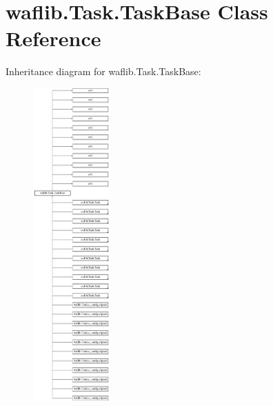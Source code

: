 \hypertarget{classwaflib_1_1_task_1_1_task_base}{}\section{waflib.\+Task.\+Task\+Base Class Reference}
\label{classwaflib_1_1_task_1_1_task_base}
Inheritance diagram for waflib.\+Task.\+Task\+Base\+:\begin{figure}[H]
\begin{center}
\leavevmode
\includegraphics[height=12.000000cm]{classwaflib_1_1_task_1_1_task_base}
\end{center}
\end{figure}
